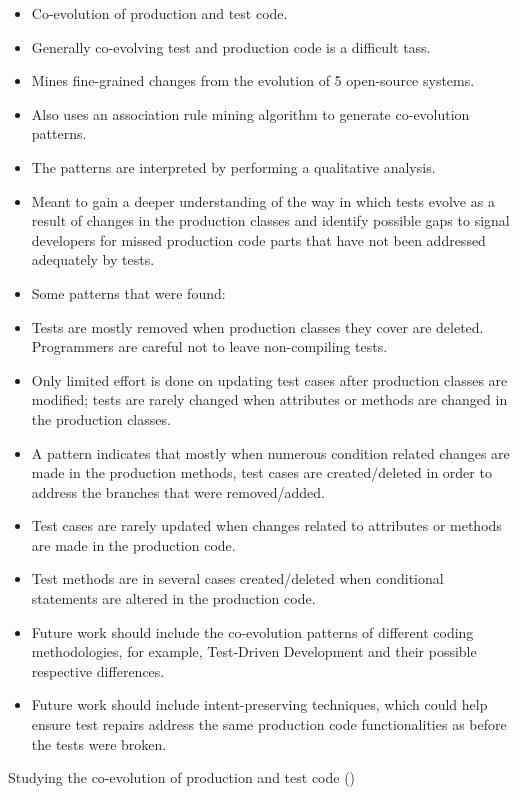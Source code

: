 \documentclass[]{book}
\providecommand{\tightlist}{%
  \setlength{\itemsep}{0pt}\setlength{\parskip}{0pt}}
\begin{document}
\begin{itemize}
\tightlist
\item
  Co-evolution of production and test code.
\item
  Generally co-evolving test and production code is a difficult tass.
\item
  Mines fine-grained changes from the evolution of 5 open-source
  systems.
\item
  Also uses an association rule mining algorithm to generate
  co-evolution patterns.
\item
  The patterns are interpreted by performing a qualitative analysis.
\item
  Meant to gain a deeper understanding of the way in which tests evolve
  as a result of changes in the production classes and identify possible
  gaps to signal developers for missed production code parts that have
  not been addressed adequately by tests.
\item
  Some patterns that were found:
\item
  Tests are mostly removed when production classes they cover are
  deleted. Programmers are careful not to leave non-compiling tests.
\item
  Only limited effort is done on updating test cases after production
  classes are modified; tests are rarely changed when attributes or
  methods are changed in the production classes.
\item
  A pattern indicates that mostly when numerous condition related
  changes are made in the production methods, test cases are
  created/deleted in order to address the branches that were
  removed/added.
\item
  Test cases are rarely updated when changes related to attributes or
  methods are made in the production code.
\item
  Test methods are in several cases created/deleted when conditional
  statements are altered in the production code.
\item
  Future work should include the co-evolution patterns of different
  coding methodologies, for example, Test-Driven Development and their
  possible respective differences.
\item
  Future work should include intent-preserving techniques, which could
  help ensure test repairs address the same production code
  functionalities as before the tests were broken.
\end{itemize}

Studying the co-evolution of production and test code
(\citet{zaidman2011studying})
\end{document}
